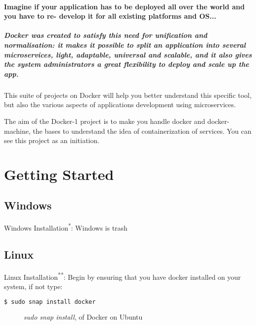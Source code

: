 \paragraph{Imagine if your application has to be deployed all over the world and you have to re-
develop it for all existing platforms and OS...}
\subparagraph{Docker was created to satisfy this need for unification and normalisation: it makes it
possible to split an application into several microservices, light, adaptable, universal and
scalable, and it also gives the system administrators a great flexibility to deploy and scale
up the app.}
This suite of projects on Docker will help you better understand this specific tool, but
also the various aspects of applications development using microservices.

The aim of the Docker-1 project is to make you handle docker and docker-machine, the
bases to understand the idea of containerization of services. You can see this project as
an initiation.

\section{Getting Started}

\subsection{Windows}
Windows Installation\textsuperscript{*}: Windows is trash\cite{Docker:Windows_Install}

\subsection{Linux}
\noindent Linux Installation\textsuperscript{**}: Begin by ensuring that you have docker\cite{Docker:Linux_Install} installed on your system, if not type:
\begin{lstlisting}[language=bash]
    $ sudo snap install docker
\end{lstlisting}
\begin{figure}[h]
    \centering
    \caption[Snap Install of Docker]{\emph{sudo snap install}, of Docker on Ubuntu}
    \label{fig:00-01 - terminal error VBoxManage} 
\end{figure}

